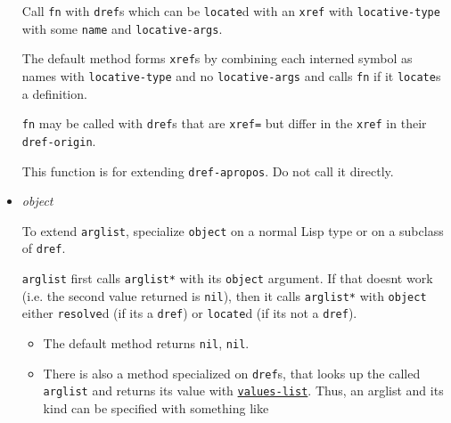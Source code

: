 \begin{itemize}
  Call \texttt{fn} with \texttt{dref}s which can be \texttt{locate}d
  with an \texttt{xref} with \texttt{locative-type} with some
  \texttt{name} and \texttt{locative-args}.

  The default method forms \texttt{xref}s by combining each interned
  symbol as names with \texttt{locative-type} and no
  \texttt{locative-args} and calls \texttt{fn} if it \texttt{locate}s a
  definition.

  \texttt{fn} may be called with \texttt{dref}s that are \texttt{xref=}
  but differ in the \texttt{xref} in their \texttt{dref-origin}.

  This function is for extending \texttt{dref-apropos}. Do not call it
  directly.
\item
  \label{x-28DREF-EXT-3AARGLIST-2A-20GENERIC-FUNCTION-29}
  \emph{object}

  To extend \texttt{arglist}, specialize \texttt{object} on a normal
  Lisp type or on a subclass of \texttt{dref}.

  \texttt{arglist} first calls \texttt{arglist*} with its
  \texttt{object} argument. If that doesn\textquotesingle t work (i.e.
  the second value returned is \texttt{nil}), then it calls
  \texttt{arglist*} with \texttt{object} either \texttt{resolve}d (if
  it\textquotesingle s a \texttt{dref}) or \texttt{locate}d (if
  it\textquotesingle s not a \texttt{dref}).

  \begin{itemize}
  \item
    The default method returns \texttt{nil}, \texttt{nil}.
  \item
    There is also a method specialized on \texttt{dref}s, that looks up
    the
    called \texttt{arglist} and returns its value with
    \href{http://www.lispworks.com/documentation/HyperSpec/Body/f_vals_l.htm}{\texttt{values-list}}.
    Thus, an arglist and its kind can be specified with something like

\begin{Shaded}
\begin{Highlighting}[]
\NormalTok{(}\NormalTok{)}
\NormalTok{      (}
\end{Highlighting}
\end{Shaded}
  \end{itemize}


\end{itemize}

